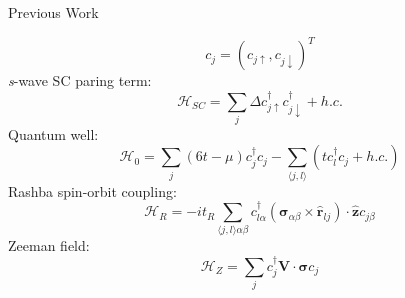 \documentclass[xcolor=dvipsnames,10pt,aspectratio=169]{beamer}
\let\oldhat\hat
\renewcommand{\hat}[1]{\oldhat{\mathbf{#1}}}
\renewcommand{\vec}[1]{\mathbf{#1}}
\newcommand{\ham}{\mathcal{H}}
\newcommand{\cc}{c^{\dagger}}
\newcommand{\de}{\Delta}
\newcommand{\PW}{Previous Work}
\begin{document}
  \begin{frame}{\PW}
    \begin{multicols}{2}
      \centering
      \small
      \begin{equation}
        c_j = (c_{j\uparrow}, c_{j\downarrow})^T
      \end{equation}
      \textit{s}-wave SC paring term:
      \begin{equation}
        \ham_{SC} = \sum_j \de \cc_{j\uparrow} \cc_{j\downarrow} + h.c.
      \end{equation}
      Quantum well:
      \begin{equation}
        \ham_0 = \sum_j (6t - \mu) \cc_j c_j - \sum_{\langle j,l \rangle} (t \cc_l c_j + h.c.)
      \end{equation}
      Rashba spin-orbit coupling:
      \begin{equation}
        \ham_R = -it_R \sum_{\langle j,l \rangle \alpha\beta} \cc_{l\alpha} (\bm{\sigma}_{\alpha\beta} \times \hat{r}_{lj}) \cdot \hat{z} c_{j\beta}
      \end{equation}
      Zeeman field:
      \begin{equation}
        \ham_Z = \sum_j \cc_j \vec{V}\cdot \bm{\sigma} c_j
      \end{equation}

    \end{multicols}
  \end{frame}
\end{document}
